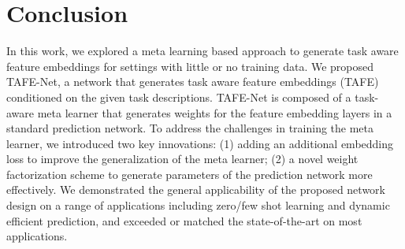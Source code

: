 \documentclass[10pt,twocolumn,letterpaper]{article}
\newcommand{\model}{TAFE-Net\xspace}
\begin{document}
\section{Conclusion}
In this work, we explored a meta learning based approach to generate task aware feature embeddings for settings with little or no training data.
We proposed TAFE-Net, a network that generates task aware feature embeddings (TAFE) conditioned on the given task descriptions.
\model is composed of a task-aware 
meta learner that generates weights for the feature embedding layers in a standard prediction network.
To address the challenges in training the meta learner, we introduced two key
innovations: (1) adding an additional embedding loss to improve the generalization of the meta learner; (2) a novel weight factorization
scheme to generate parameters of the prediction network more effectively. 
We demonstrated the general applicability of the proposed network design on a range of applications including zero/few shot learning and dynamic
efficient prediction, and exceeded or matched the state-of-the-art on most applications. 





{\small


}
\end{document}
